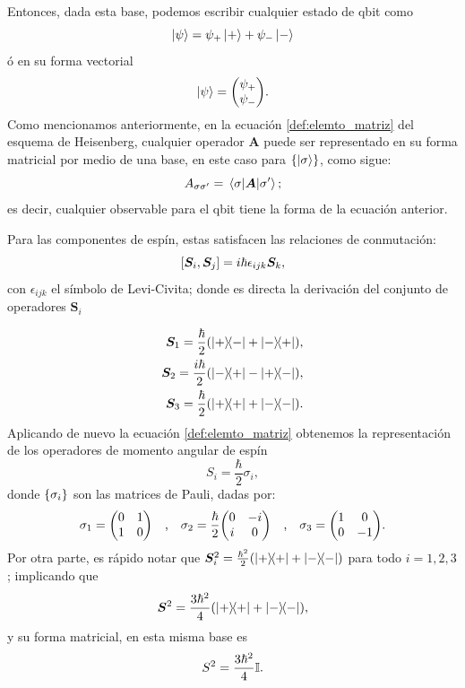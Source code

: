 \documentclass[../Main.tex]{subfiles}
\begin{document}
Entonces, dada esta base, podemos escribir cualquier estado de qbit como
\begin{equation}
    \ket{\psi}=\psi_{+}\ket{+}+\psi_{-}\ket{-}
\end{equation}
ó en su forma vectorial 
\begin{equation}
    \ket{\psi}=\mqty(\psi_{+}\\\psi_{-}).
\end{equation}
Como mencionamos anteriormente, en la ecuación \eqref{def:elemto_matriz} del esquema de Heisenberg, cualquier operador $\bm{A}$ puede ser representado en su forma matricial por medio de una base, en este caso para $\qty{\ket{\sigma}}$, como sigue:
\begin{equation}
    A_{\sigma\sigma'}=\mel{\sigma}{\bm{A}}{\sigma'};
\end{equation}
es decir, cualquier observable para el qbit tiene la forma de la ecuación anterior.

Para las componentes de espín, estas satisfacen las relaciones de conmutación:
\begin{equation}
    \qty[\bm{S}_i,\bm{S}_j]=i\hbar\epsilon_{ijk}\bm{S}_k,
\end{equation}
con $\epsilon_{ijk}$ el símbolo de Levi-Civita; donde es directa la derivación del conjunto de operadores $\bm{S}_i$

\begin{subequations}\label{eq:operadores_espin}
    \begin{align}
        \bm{S}_1=\frac{\hbar}{2}\qty(\op{+}{-}+\op{-}{+}),\\
        \bm{S}_2=\frac{i\hbar}{2}\qty(\op{-}{+}-\op{+}{-}),\\
        \bm{S}_3=\frac{\hbar}{2}\qty(\op{+}+\op{-}).
    \end{align}
\end{subequations}
Aplicando de nuevo la ecuación \eqref{def:elemto_matriz} obtenemos la representación de los operadores de momento angular de espín
\begin{equation}
    S_i=\frac{\hbar}{2}\sigma_i,
\end{equation}
donde $\qty{\sigma_i}$ son las matrices de Pauli, dadas por:
\begin{equation}
    \sigma_1=\mqty(0&1\\1&0)\qq{,}\sigma_2=\frac{\hbar}{2}\mqty(0&-i\\i&0)\qq{,}\sigma_3=\mqty(1&0\\0&-1).
\end{equation}
Por otra parte, es rápido notar que $\bm{S}^2_i=\frac{\hbar^2}{2}\qty(\op{+}+\op{-})$ para todo $i=1,2,3$; implicando que
\begin{equation}
    \bm{S}^2=\frac{3\hbar^2}{4}\qty(\op{+}+\op{-}),
\end{equation}
y su forma matricial, en esta misma base es
\begin{equation}
    S^2=\frac{3\hbar^2}{4}\mathbb{I}.
\end{equation}
\end{document}
